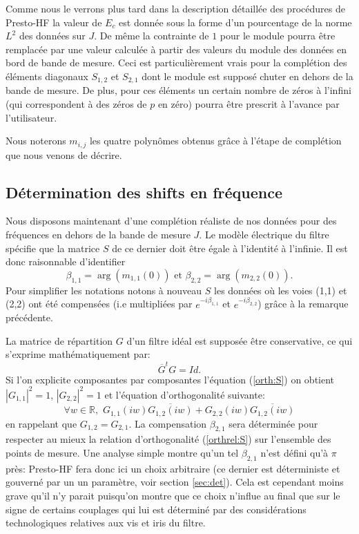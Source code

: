 \documentclass[12]{article}
\def\prest{Presto-HF\xspace}
\def\RR{{\mathbb R}}
\begin{document}
Comme nous le verrons plus tard dans la description d\'etaill\'ee des
proc\'edures de \prest la valeur de $E_c$ est donn\'ee sous la forme d'un
pourcentage de la norme $L^2$ des donn\'ees sur $J$. De m\^eme la
contrainte de $1$ pour le module pourra \^etre remplac\'ee par une valeur
calcul\'ee \`a partir des valeurs du module des donn\'ees en bord de
bande de mesure. Ceci est particuli\`erement vrais pour la compl\'etion
des \'el\'ements diagonaux $S_{1,2}$ et $S_{2,1}$ dont le module est
suppos\'e chuter en dehors de la bande de mesure. De plus, pour ces
\'el\'ements un certain nombre de z\'eros \`a l'infini (qui correspondent
\`a des z\'eros de $p$ en z\'ero) pourra \^etre prescrit \`a l'avance par l'utilisateur.

Nous noterons $m_{i,j}$ les quatre polyn\^omes obtenus gr\^ace \`a
l'\'etape de compl\'etion que nous venons de d\'ecrire.


\subsection{D\'etermination des shifts en fr\'equence}
\label{sec:shift}
Nous disposons maintenant d'une compl\'etion \og r\'ealiste \fg de nos
donn\'ees pour des fr\'equences en dehors de la bande de mesure $J$. Le
mod\`ele \'electrique du filtre sp\'ecifie que la matrice $S$ de ce
dernier doit \^etre \'egale \`a l'identit\'e \`a l'infinie. Il est donc
raisonnable d'identifier 
$$ \beta_{1,1}=\arg(m_{1,1}(0)) \mbox{  et  }
\beta_{2,2}=\arg(m_{2,2}(0)).$$
Pour simplifier les notations notons \`a nouveau $S$ les donn\'ees o\`u
les voies (1,1) et (2,2) ont \'et\'e compens\'ees (i.e multipli\'ees
par $e^{-i\beta_{1,1}}$ et $e^{-i\beta_{2,2}}$) gr\^ace \`a la remarque 
pr\'ec\'edente. 

La matrice de r\'epartition $G$ d'un filtre id\'eal est suppos\'ee \^etre
conservative, ce qui s'exprime math\'ematiquement par:
\begin{equation}
\label{orth:S}
 \overline G^tG=Id.
\end{equation}
Si l'on explicite composantes par composantes l'\'equation (\ref{orth:S}) on
obtient $|G_{1,1}|^2=1$, $|G_{2,2}|^2=1$ et l'\'equation d'orthogonalit\'e
suivante:
\begin{equation}
\label{orthrel:S}
\forall w \in \RR,\,\,G_{1,1}(iw)\overline {G_{1,2}(iw)} + G_{2,2}(iw)\overline
{G_{1,2}(iw)}
\end{equation}
en rappelant que $G_{1,2}=G_{2,1}$. La compensation $\beta_{2,1}$ sera
d\'etermin\'ee pour respecter au mieux la relation
d'orthogonalit\'e (\ref{orthrel:S}) sur l'ensemble des points de mesure. Une analyse simple montre qu'un tel $\beta_{2,1}$
n'est d\'efini qu'\`a $\pi$ pr\`es: \prest fera donc ici un choix arbitraire 
(ce dernier est d\'eterministe et gouvern\'e par un un param\`etre, voir 
section \ref{sec:det}). Cela est cependant moins grave qu'il n'y parait
puisqu'on montre que ce
choix n'influe au final que sur le signe de certains couplages qui lui est d\'etermin\'e par des consid\'erations
technologiques relatives aux vis et iris du filtre.
\end{document}

